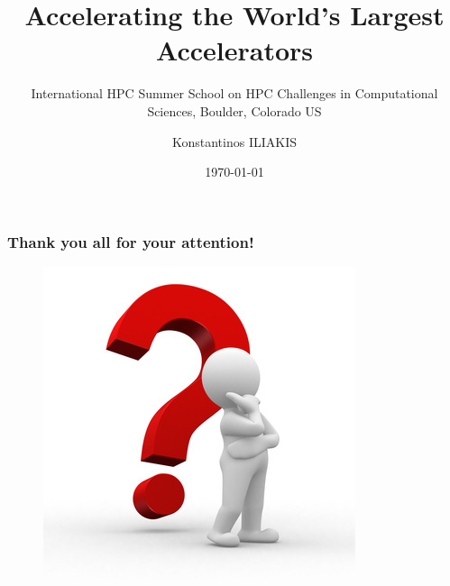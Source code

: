 \documentclass[8pt]{beamer}
\title[HPC @ CERN]{Accelerating the World's Largest Accelerators} %
\subtitle{International HPC Summer School on HPC Challenges in Computational Sciences, Boulder, Colorado US}
\author{Konstantinos ILIAKIS} %
\institute{CERN/NTUA} %
\date{\today} %
\begin{document}
\begin{frame}
\titlepage %
\end{frame}






%	


\begin{frame}
	\frametitle{Thank you all for your attention!}
	\begin{figure}[h]
		\centering
		\includegraphics[width=.3\textwidth]{figures/question_mark.jpg}
	\end{figure}
\end{frame}

\end{document}
